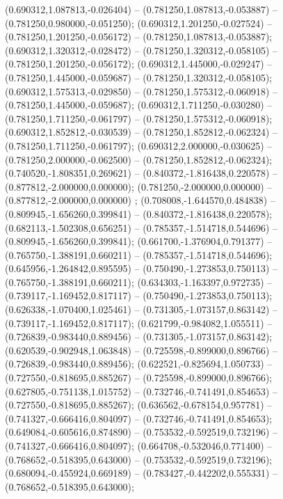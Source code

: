  (0.690312,1.087813,-0.026404) -- (0.781250,1.087813,-0.053887) -- (0.781250,0.980000,-0.051250);
 (0.690312,1.201250,-0.027524) -- (0.781250,1.201250,-0.056172) -- (0.781250,1.087813,-0.053887);
 (0.690312,1.320312,-0.028472) -- (0.781250,1.320312,-0.058105) -- (0.781250,1.201250,-0.056172);
 (0.690312,1.445000,-0.029247) -- (0.781250,1.445000,-0.059687) -- (0.781250,1.320312,-0.058105);
 (0.690312,1.575313,-0.029850) -- (0.781250,1.575312,-0.060918) -- (0.781250,1.445000,-0.059687);
 (0.690312,1.711250,-0.030280) -- (0.781250,1.711250,-0.061797) -- (0.781250,1.575312,-0.060918);
 (0.690312,1.852812,-0.030539) -- (0.781250,1.852812,-0.062324) -- (0.781250,1.711250,-0.061797);
 (0.690312,2.000000,-0.030625) -- (0.781250,2.000000,-0.062500) -- (0.781250,1.852812,-0.062324);
 (0.740520,-1.808351,0.269621) -- (0.840372,-1.816438,0.220578) -- (0.877812,-2.000000,0.000000);
 (0.781250,-2.000000,0.000000) -- (0.877812,-2.000000,0.000000) ;
 (0.708008,-1.644570,0.484838) -- (0.809945,-1.656260,0.399841) -- (0.840372,-1.816438,0.220578);
 (0.682113,-1.502308,0.656251) -- (0.785357,-1.514718,0.544696) -- (0.809945,-1.656260,0.399841);
 (0.661700,-1.376904,0.791377) -- (0.765750,-1.388191,0.660211) -- (0.785357,-1.514718,0.544696);
 (0.645956,-1.264842,0.895595) -- (0.750490,-1.273853,0.750113) -- (0.765750,-1.388191,0.660211);
 (0.634303,-1.163397,0.972735) -- (0.739117,-1.169452,0.817117) -- (0.750490,-1.273853,0.750113);
 (0.626338,-1.070400,1.025461) -- (0.731305,-1.073157,0.863142) -- (0.739117,-1.169452,0.817117);
 (0.621799,-0.984082,1.055511) -- (0.726839,-0.983440,0.889456) -- (0.731305,-1.073157,0.863142);
 (0.620539,-0.902948,1.063848) -- (0.725598,-0.899000,0.896766) -- (0.726839,-0.983440,0.889456);
 (0.622521,-0.825694,1.050733) -- (0.727550,-0.818695,0.885267) -- (0.725598,-0.899000,0.896766);
 (0.627805,-0.751138,1.015752) -- (0.732746,-0.741491,0.854653) -- (0.727550,-0.818695,0.885267);
 (0.636562,-0.678154,0.957781) -- (0.741327,-0.666416,0.804097) -- (0.732746,-0.741491,0.854653);
 (0.649084,-0.605616,0.874890) -- (0.753532,-0.592519,0.732196) -- (0.741327,-0.666416,0.804097);
 (0.664708,-0.532046,0.771400) -- (0.768652,-0.518395,0.643000) -- (0.753532,-0.592519,0.732196);
 (0.680094,-0.455924,0.669189) -- (0.783427,-0.442202,0.555331) -- (0.768652,-0.518395,0.643000);
